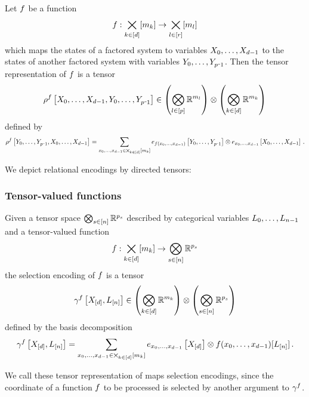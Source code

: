 \begin{definition}\label{def:functionRepresentation}
	Let $f$ be a function
		\[ f : \bigtimes_{k\in[d]}[m_{k}] \rightarrow  \bigtimes_{l\in[r]}[m_{l}] \]
	which maps the states of a factored system to variables $X_{0},\ldots,X_{d-1}$ to the states of another factored system with variables $\seccatvariables$.
	Then the tensor representation of $f$ is a tensor
		\[ \rencodingofat{\exformula}{\catvariables,\seccatvariables} \in  \left(\secfacspace\right) \otimes \left(\facspace\right)  \]
	defined by
		\[ \rencodingofat{\exformula}{\seccatvariables,\catvariables}= \sum_{\catindices\in\facstates}
		\onehotmapofat{\exfunction(\catindices)}{\seccatvariables} \otimes  \onehotmapofat{\catindices}{\catvariables} \, . \]
\end{definition}

We depict relational encodings by directed tensors:
\begin{center}
	
\end{center}






\subsubsection{Tensor-valued functions}


\begin{definition}\label{def:selectionEncoding}
	Given a tensor space $\bigotimes_{s\in[n]}\mathbb{R}^{p_{s}}$ described by categorical variables $L_{0},\ldots,L_{n-1}$ and a tensor-valued function
		\[ f : \bigtimes_{k\in[d]}[m_{k}] \rightarrow \bigotimes_{s\in[n]}\mathbb{R}^{p_{s}} \]
	the selection encoding of $f$ is a tensor
		\[ \gamma^{f}\left[X_{[d]},L_{[n]}\right] \in \left(\bigotimes_{k\in[d]} \mathbb{R}^{m_{k}}\right) \otimes \left(\bigotimes_{s\in[n]}\mathbb{R}^{p_{s}}\right) \]
	defined by the basis decomposition
		\[ \gamma^{f}\left[X_{[d]},L_{[n]}\right] = \sum_{x_{0},\ldots,x_{d-1}\in\bigtimes_{k\in[d]}[m_{k}]} e_{x_{0},\ldots,x_{d-1}}\left[X_{[d]}\right] \otimes f(x_{0},\ldots,x_{d-1})[L_{[n]}] \, .  \]
\end{definition}

We call these tensor representation of maps selection encodings, since the coordinate of a function $f$ to be processed is selected by another argument to $\gamma^{f}$.


